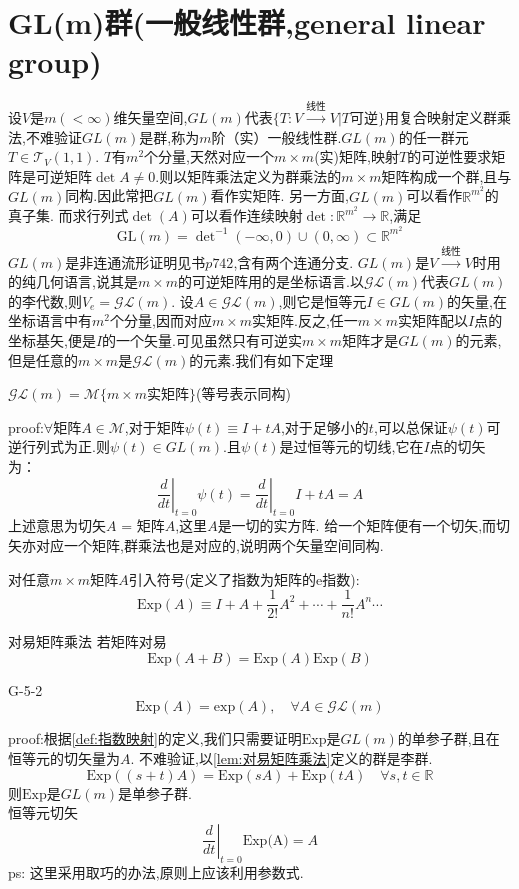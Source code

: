 \documentclass[../main.tex]{subfiles}
\begin{document}
 \section{GL(m)群(一般线性群,general linear group)}
 设$V$是$m(<\infty)$维矢量空间,$GL(m)$代表$\{T:V\xrightarrow{\text{线性}}V|T\text{可逆}\}$用复合映射定义群乘法,不难验证$GL(m)$是群,称为$m$阶（实）一般线性群.$GL(m)$的任一群元$T\in\mathscr{T}_V(1,1)$.
 $T$有$m^2$个分量,天然对应一个$m\times m$(实)矩阵,映射$T$的可逆性要求矩阵是可逆矩阵$\det{A}\ne 0$.则以矩阵乘法定义为群乘法的$m\times m$矩阵构成一个群,且与$GL(m)$同构.因此常把$GL(m)$看作实矩阵.
 另一方面,$GL(m)$可以看作$\mathbb{R}^{m^2}$的真子集.
 而求行列式$\det(A)$可以看作连续映射$\det:\mathbb{R}^{m^2}\rightarrow \mathbb{R}$,满足
     $$ \text{GL}(m) = \det\nolimits^{-1}(-\infty,0)\cup(0,\infty) \subset \mathbb{R}^{m^2} $$
 $GL(m)$是非连通流形证明见书$p742$,含有两个连通分支.
  $GL(m)$是$V\xrightarrow{\text{线性}}V$时用的纯几何语言,说其是$m\times m$的可逆矩阵用的是坐标语言.以$\mathscr{GL}(m)$代表$GL(m)$的李代数,则$V_e = \mathscr{GL}(m)$.
 设$A\in \mathscr{GL}{(m)}$,则它是恒等元$I \in GL(m)$的矢量,在坐标语言中有$m^2$个分量,因而对应$m\times m$实矩阵.反之,任一$m\times m$实矩阵配以$I$点的坐标基矢,便是$I$的一个矢量.可见虽然只有可逆实$m\times m$矩阵才是$GL(m)$的元素,但是任意的$m\times m$是$\mathscr{GL}(m)$的元素.我们有如下定理
 \begin{theorem}
     $\mathscr{GL}(m) = \mathscr{M}\{m\times m \text{实矩阵}\}$(等号表示同构)
 \end{theorem}
    proof:$\forall$矩阵$A\in \mathscr{M}$,对于矩阵$\psi(t)\equiv I + tA$,对于足够小的$t$,可以总保证$\psi(t)$可逆行列式为正.则$\psi(t) \in GL(m)$.且$\psi(t)$是过恒等元的切线,它在$I$点的切矢为：
 $$
 \left.\frac{d}{dt}\right|_{t=0}\psi(t) = \left.\frac{d}{dt}\right|_{t=0}I + tA = A
 $$
 上述意思为切矢$A$ = 矩阵$A$,这里$A$是一切的实方阵.
 给一个矩阵便有一个切矢,而切矢亦对应一个矩阵,群乘法也是对应的,说明两个矢量空间同构.

 对任意$m\times m$矩阵$A$引入符号(定义了指数为矩阵的e指数):
     $$ \text{Exp}(A)\equiv I + A + \frac{1}{2!}A^2 +\cdots+\frac{1}{n!}A^n\cdots $$
 \begin{lemma}{}{对易矩阵乘法}
    若矩阵对易
     $$ \text{Exp}(A+B)= \text{Exp}(A)\text{Exp}(B) $$
 \end{lemma}
\begin{theorem}{}{G-5-2}
	$$ \text{Exp}(A) = \text{exp}(A),\quad\forall A \in \mathscr{GL}(m) $$
\end{theorem}
 proof:根据\ref{def:指数映射}的定义,我们只需要证明$\text{Exp}$是$GL(m)$的单参子群,且在恒等元的切矢量为$A$.
     不难验证,以\ref{lem:对易矩阵乘法}定义的群是李群.
     $$ \text{Exp}((s+t)A) = \text{Exp}(sA) + \text{Exp}(tA) \quad \forall s,t \in \mathbb{R}$$
     则$\text{Exp}$是$GL(m)$是单参子群.\\
     恒等元切矢
     \begin{equation*}
         \left.\frac{d}{dt}\right|_{t=0}\text{Exp(A)}= A
     \end{equation*}
     ps: 这里采用取巧的办法,原则上应该利用参数式.
\end{document}
